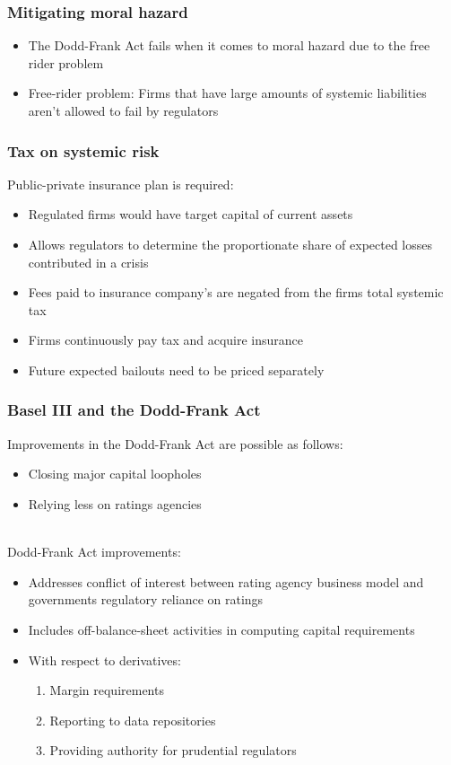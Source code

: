 \documentclass[11pt]{beamer}
\begin{document}

\begin{frame}
\frametitle{Mitigating moral hazard}
\begin{itemize}
\item The Dodd-Frank Act fails when it comes to moral hazard due to the free rider problem
\item Free-rider problem: Firms that have large amounts of systemic liabilities aren't allowed to fail by regulators
\end{itemize}
\end{frame}


\begin{frame}
\frametitle{Tax on systemic risk}
Public-private insurance plan is required:
\begin{itemize}\itemsep10pt
\item Regulated firms would have target capital of current assets
\item Allows regulators to determine the proportionate share of expected losses contributed in a crisis
\item Fees paid to insurance company's are negated from the firms total systemic tax
\item Firms continuously pay tax and acquire insurance
\item Future expected bailouts need to be priced separately
\end{itemize}
\end{frame}



\begin{frame}
\frametitle{Basel III and the Dodd-Frank Act}
Improvements in the Dodd-Frank Act are possible as follows:
\begin{itemize}
\item Closing major capital loopholes
\item Relying less on ratings agencies
\end{itemize}
~\\
Dodd-Frank Act improvements:
\begin{itemize}
\item Addresses conflict of interest between rating agency business model and governments regulatory reliance on ratings
\item Includes off-balance-sheet activities in computing capital requirements
\item With respect to derivatives:
\begin{enumerate}
\item Margin requirements
\item Reporting to data repositories
\item Providing authority for prudential regulators
\end{enumerate}
\end{itemize}
\end{frame}
\end{document}

